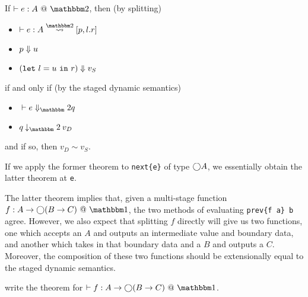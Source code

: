 \begin{theorem}
If $\vdash e:A~@~\bbtwo$, then (by splitting)
\begin{itemize}
\item $\vdash e : A \splittwosym [p,l.r]$
\item ${p} \Downarrow {u}$
\item ${({\tt let}~{l} = {u}~{\tt in}~{r})} \Downarrow {v_S}$
\end{itemize}
if and only if (by the staged dynamic semantics)
\begin{itemize}
\item $\diatwo [] e q$
\item $q \mathbin{\tworedsym} v_D$
\end{itemize}
and if so, then $v_D \sim v_S$.
\end{theorem}

If we apply the former theorem to \verb|next{e}| of type $\bigcirc A$, we
essentially obtain the latter theorem at \verb|e|.

The latter theorem implies that, given a multi-stage function $f:A\to\fut(B\to
C)~@~\bbone$, the two methods of evaluating \verb|prev{f a} b| agree.
However, we also expect that splitting $f$ directly will give us two functions,
one which accepts an $A$ and outputs an intermediate value and boundary data,
and another which takes in that boundary data and a $B$ and outputs a $C$.
Moreover, the composition of these two functions should be extensionally equal
to the staged dynamic semantics.

\TODO write the theorem for $\vdash f:A\to\fut(B\to C)~@~\bbone$.

